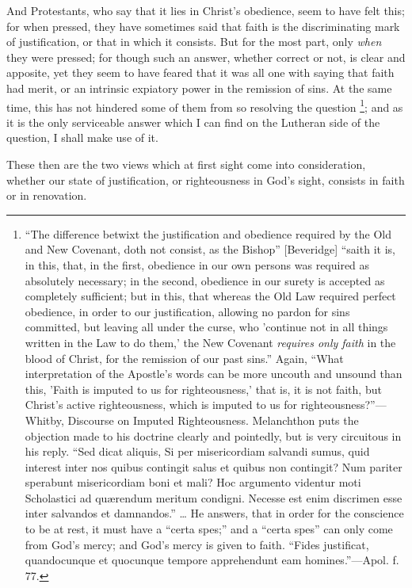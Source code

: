 And Protestants, who say that it lies in Christ's obedience, seem
to have felt this; for when pressed, they have sometimes said that
faith is the discriminating mark of justification, or that in which it
consists. But for the most part, only \emph{when} they were pressed;
for though such an answer, whether correct or not, is clear and
apposite, yet they seem to have feared that it was all one with saying
that faith had merit, or an intrinsic expiatory power in the remission
of sins. At the same time, this has not hindered some of them from so
resolving the question \footnote{``The difference betwixt the justification and obedience
required by the Old and New Covenant, doth not consist, as the
Bishop'' [Beveridge] ``saith it is, in this, that, in the
first, obedience in our own persons was required as absolutely
necessary; in the second, obedience in our surety is accepted as
completely sufficient; but in this, that whereas the Old Law required
perfect obedience, in order to our justification, allowing no pardon
for sins committed, but leaving all under the curse, who 'continue not
in all things written in the Law to do them,' the New Covenant \emph{requires
only faith} in the blood of Christ, for the remission of our past
sins.'' Again, ``What interpretation of the Apostle's words
can be more uncouth and unsound than this, 'Faith is imputed to us for
righteousness,' that is, it is not faith, but Christ's active
righteousness, which is imputed to us for righteousness?''—Whitby,
Discourse on Imputed Righteousness. Melanchthon puts the objection
made to his doctrine clearly and pointedly, but is very circuitous in
his reply. ``Sed dicat aliquis, Si per misericordiam salvandi
sumus, quid interest inter nos quibus contingit salus et quibus non
contingit? Num pariter sperabunt misericordiam boni et mali? Hoc
argumento videntur moti Scholastici ad quærendum meritum condigni.
Necesse est enim discrimen esse inter salvandos et damnandos.''
… He answers, that in order for the conscience to be at rest, it
must have a ``certa spes;'' and a ``certa spes'' can
only come from God's mercy; and God's mercy is given to faith.
``Fides justificat, quandocunque et quocunque tempore apprehendunt
eam homines.''—Apol. f. 77.};
and as it is the only serviceable answer which I can find on the
Lutheran side of the question, I shall make use of it.

These then are the two views which at first sight come into
consideration, whether our state of justification, or righteousness in
God's sight, consists in faith or in renovation.

